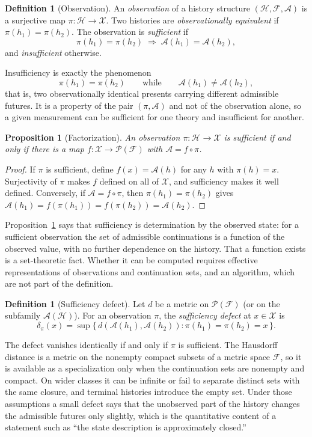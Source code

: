 \documentclass[11pt,oneside]{book}
\newtheorem{proposition}[theorem]{Proposition}
\theoremstyle{definition}
\newtheorem{definition}[theorem]{Definition}
\theoremstyle{remark}
\newcommand{\Hist}{\mathcal{H}}
\newcommand{\Fut}{\mathcal{F}}
\newcommand{\Adm}{\mathcal{A}}
\newcommand{\Obs}{\mathcal{X}}
\begin{document}
\begin{definition}[Observation]
An \emph{observation} of a history structure $(\Hist,\Fut,\Adm)$ is a surjective map $\pi\colon\Hist\to\Obs$. Two histories are \emph{observationally equivalent} if $\pi(h_1)=\pi(h_2)$. The observation is \emph{sufficient} if
\[
\pi(h_1)=\pi(h_2)\;\Longrightarrow\;\Adm(h_1)=\Adm(h_2),
\]
and \emph{insufficient} otherwise.
\end{definition}

Insufficiency is exactly the phenomenon
\[
\pi(h_1)=\pi(h_2)\qquad\text{while}\qquad\Adm(h_1)\neq\Adm(h_2),
\]
that is, two observationally identical presents carrying different admissible futures. It is a property of the pair $(\pi,\Adm)$ and not of the observation alone, so a given measurement can be sufficient for one theory and insufficient for another.

\begin{proposition}[Factorization]\label{prop:factor}
An observation $\pi\colon\Hist\to\Obs$ is sufficient if and only if there is a map $f\colon\Obs\to\mathcal P(\Fut)$ with $\Adm=f\circ\pi$.
\end{proposition}

\begin{proof}
If $\pi$ is sufficient, define $f(x)=\Adm(h)$ for any $h$ with $\pi(h)=x$. Surjectivity of $\pi$ makes $f$ defined on all of $\Obs$, and sufficiency makes it well defined. Conversely, if $\Adm=f\circ\pi$, then $\pi(h_1)=\pi(h_2)$ gives $\Adm(h_1)=f(\pi(h_1))=f(\pi(h_2))=\Adm(h_2)$.
\end{proof}

Proposition~\ref{prop:factor} says that sufficiency is determination by the observed state: for a sufficient observation the set of admissible continuations is a function of the observed value, with no further dependence on the history. That a function exists is a set-theoretic fact. Whether it can be computed requires effective representations of observations and continuation sets, and an algorithm, which are not part of the definition.

\begin{definition}[Sufficiency defect]
Let $d$ be a metric on $\mathcal P(\Fut)$ (or on the subfamily $\Adm(\Hist)$). For an observation $\pi$, the \emph{sufficiency defect} at $x\in\Obs$ is
\[
\delta_\pi(x)=\sup\{\,d(\Adm(h_1),\Adm(h_2)) : \pi(h_1)=\pi(h_2)=x\,\}.
\]
\end{definition}

The defect vanishes identically if and only if $\pi$ is sufficient. The Hausdorff distance is a metric on the nonempty compact subsets of a metric space $\Fut$, so it is available as a specialization only when the continuation sets are nonempty and compact. On wider classes it can be infinite or fail to separate distinct sets with the same closure, and terminal histories introduce the empty set. Under those assumptions a small defect says that the unobserved part of the history changes the admissible futures only slightly, which is the quantitative content of a statement such as ``the state description is approximately closed.''
\end{document}
